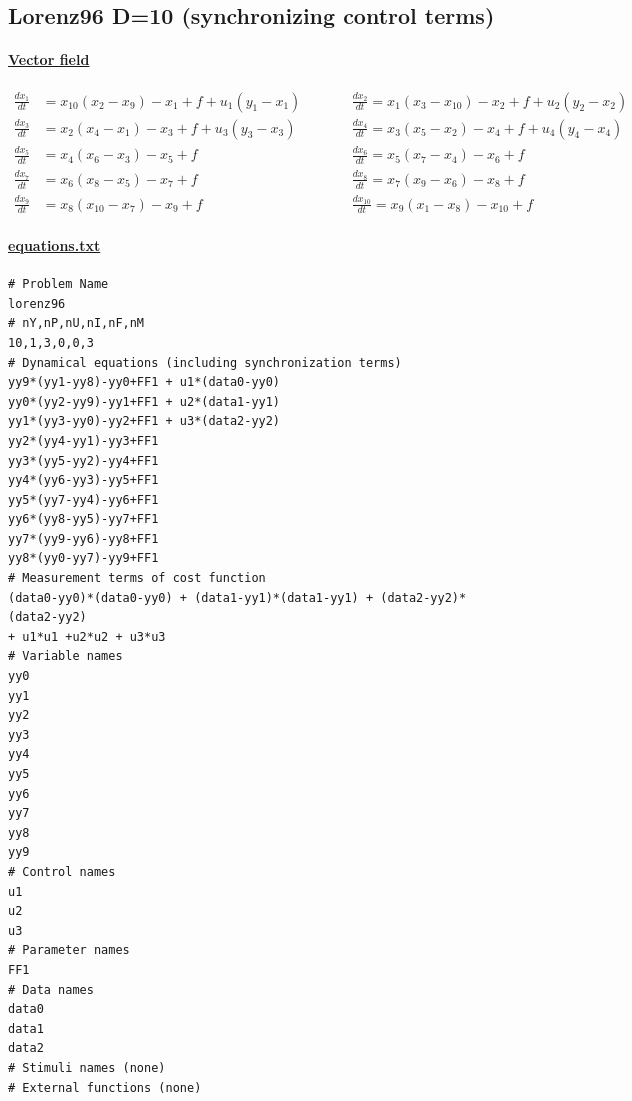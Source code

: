 \documentclass[11pt]{article}
\begin{document}
{\clearpage



\subsection{Lorenz96 D=10 (synchronizing control terms)}

\paragraph{\underline{Vector field}}
\begin{align*}
\frac{dx_1}{dt}&= x_{10}(x_2-x_9)-x_1+f + u_1(y_1 - x_1)\qquad &&\frac{dx_2}{dt}= x_1(x_3-x_{10})-x_2+f + u_2(y_2 - x_2)\\
\frac{dx_3}{dt}&= x_2(x_4-x_1)-x_3+ f + u_3(y_3- x_3) \qquad &&\frac{dx_4}{dt}= x_3(x_5-x_2)-x_4+f+ u_4(y_4 - x_4)\\
\frac{dx_5}{dt}&= x_4(x_6-x_3)-x_5+f \qquad & &\frac{dx_6}{dt}= x_5(x_7-x_4)-x_6+f\\
\frac{dx_7}{dt}&= x_6(x_8-x_5)-x_7+f  \qquad &&\frac{dx_8}{dt}= x_7(x_9-x_6)-x_8+f\\
\frac{dx_9}{dt}&= x_8(x_{10}-x_7)-x_9+f  \qquad  &&\frac{dx_{10}}{dt} = x_9(x_1-x_8)-x_{10}+f
\end{align*}
\paragraph{\underline{equations.txt}}
\begin{verbatim}
# Problem Name
lorenz96
# nY,nP,nU,nI,nF,nM
10,1,3,0,0,3
# Dynamical equations (including synchronization terms)
yy9*(yy1-yy8)-yy0+FF1 + u1*(data0-yy0)
yy0*(yy2-yy9)-yy1+FF1 + u2*(data1-yy1)
yy1*(yy3-yy0)-yy2+FF1 + u3*(data2-yy2)
yy2*(yy4-yy1)-yy3+FF1 
yy3*(yy5-yy2)-yy4+FF1
yy4*(yy6-yy3)-yy5+FF1
yy5*(yy7-yy4)-yy6+FF1
yy6*(yy8-yy5)-yy7+FF1
yy7*(yy9-yy6)-yy8+FF1
yy8*(yy0-yy7)-yy9+FF1
# Measurement terms of cost function 
(data0-yy0)*(data0-yy0) + (data1-yy1)*(data1-yy1) + (data2-yy2)*(data2-yy2) 
+ u1*u1 +u2*u2 + u3*u3
# Variable names
yy0
yy1
yy2
yy3
yy4
yy5
yy6
yy7
yy8
yy9
# Control names
u1
u2
u3
# Parameter names
FF1
# Data names
data0
data1
data2
# Stimuli names (none)
# External functions (none)
\end{verbatim}

}
\end{document}
